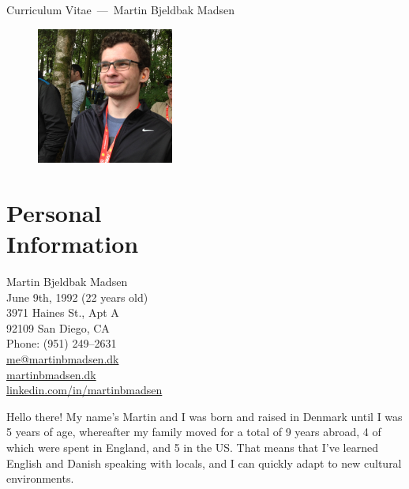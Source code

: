 \documentclass[margin,line]{resume}
\begin{document}
\raggedright%
{\sc \Large Curriculum Vitae~---~Martin Bjeldbak Madsen}
\begin{resume}
    \vspace{0.5cm}
    \begin{figure}
         \vspace{-1cm}
        \begin{center}
        \includegraphics[width=0.4\textwidth]{moi.png}
        \end{center}
         \vspace{-3.5cm}
    \end{figure}

    \section{\mysidestyle{} Personal\\Information}%
    Martin Bjeldbak Madsen\\
    June 9th, 1992 (22 years old)\\ 
    3971 Haines St., Apt A\\
    92109 San Diego, CA \\
    Phone: (951) 249--2631\\
    \href{mailto:me@martinbmadsen.dk}{me@martinbmadsen.dk}\\
    \href{http://martinbmadsen.dk}{martinbmadsen.dk}\\
    \href{http://dk.linkedin.com/in/martinbmadsen/}{linkedin.com/in/martinbmadsen}
    \vspace{1.25cm}

    Hello there! My name's Martin and I was born and raised in Denmark
    until I was 5 years of age, whereafter my family moved for a total
    of 9 years abroad, 4 of which were spent in England, and 5 in the
    US\@. That means that I've learned English and Danish speaking with
    locals, and I can quickly adapt to new cultural environments.


\end{resume}
\end{document}
